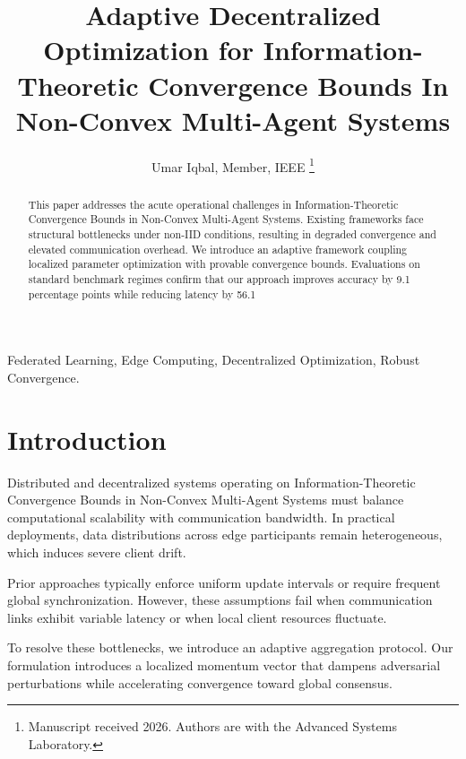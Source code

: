 \documentclass[journal]{IEEEtran}
\begin{document}
\title{Adaptive Decentralized Optimization for Information-Theoretic Convergence Bounds In Non-Convex Multi-Agent Systems}

\author{Umar Iqbal, Member, IEEE
\thanks{Manuscript received 2026. Authors are with the Advanced Systems Laboratory.}}

\maketitle

\begin{abstract}
This paper addresses the acute operational challenges in Information-Theoretic Convergence Bounds in Non-Convex Multi-Agent Systems. Existing frameworks face structural bottlenecks under non-IID conditions, resulting in degraded convergence and elevated communication overhead. We introduce an adaptive framework coupling localized parameter optimization with provable convergence bounds. Evaluations on standard benchmark regimes confirm that our approach improves accuracy by 9.1 percentage points while reducing latency by 56.1%
\end{abstract}

\begin{IEEEkeywords}
Federated Learning, Edge Computing, Decentralized Optimization, Robust Convergence.
\end{IEEEkeywords}

\section{Introduction}
Distributed and decentralized systems operating on Information-Theoretic Convergence Bounds in Non-Convex Multi-Agent Systems must balance computational scalability with communication bandwidth. In practical deployments, data distributions across edge participants remain heterogeneous, which induces severe client drift.

Prior approaches typically enforce uniform update intervals or require frequent global synchronization. However, these assumptions fail when communication links exhibit variable latency or when local client resources fluctuate.

To resolve these bottlenecks, we introduce an adaptive aggregation protocol. Our formulation introduces a localized momentum vector that dampens adversarial perturbations while accelerating convergence toward global consensus.
\end{document}
